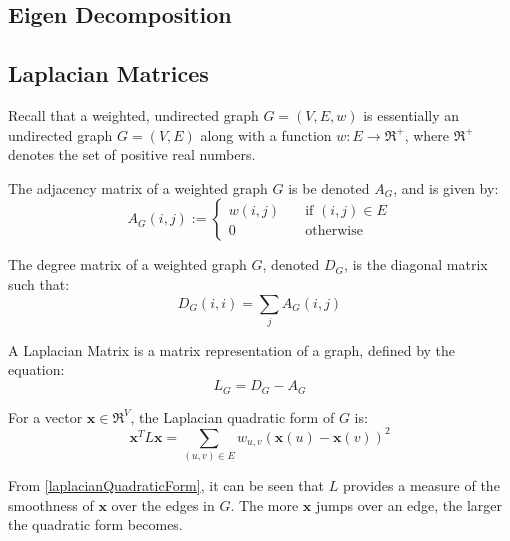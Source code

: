\subsection{Eigen Decomposition}
\label{eigenDecomposition}

\subsection{Laplacian Matrices}
\label{laplacianMatrices}
\nocite{Berkeley:1999,Pati:2011,Spielman:2006}
Recall that a weighted, undirected graph $G = (V,E,w)$ is essentially an
undirected graph $G = (V,E)$ along with a function $w : E \rightarrow \Re^+$,
where $\Re^+$ denotes the set of positive real numbers.

The adjacency matrix of a weighted graph $G$ is be denoted $A_G$, and is given
by:
\begin{equation}
    A_{G}(i,j) :=
        \left\{
            \begin{array}{ll}
                \mathit{w}(i,j) &   \quad \text{if $(i,j) \in E$}\\
                0 &                 \quad \text{otherwise}
            \end{array}
        \right.
\end{equation}

The degree matrix of a weighted graph $G$, denoted $D_G$, is the diagonal matrix
such that:
\begin{equation}
    D_G(i,i) = \sum_j A_G(i,j)
\end{equation}

A Laplacian Matrix is a matrix representation of a graph, defined by the
equation:
\begin{equation}
    L_G = D_G - A_G
\end{equation}

For a vector $\textbf{x} \in \Re^V$, the Laplacian quadratic form of $G$ is:
\begin{equation}
    \label{laplacianQuadraticForm}
    \textbf{x}^T L \textbf{x} = \sum_{(u,v) \in E} w_{u,v}(\textbf{x}(u) - \textbf{x}(v))^2
\end{equation}

From \autoref{laplacianQuadraticForm}, it can be seen that $L$ provides a
measure of the smoothness of $\textbf{x}$ over the edges in $G$. The more
$\textbf{x}$ jumps over an edge, the larger the quadratic form becomes.

